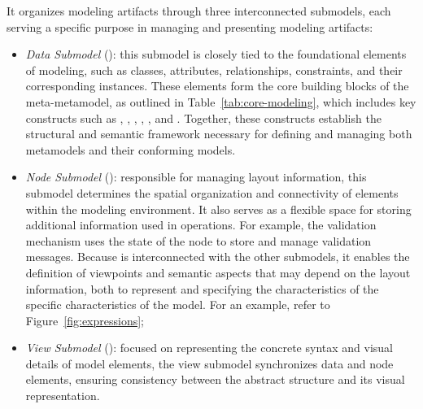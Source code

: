 %

It organizes modeling artifacts through three interconnected submodels, each serving a specific purpose in managing and presenting modeling artifacts: 
\begin{itemize}

    \item \textit{Data Submodel} (): this submodel is closely tied to the foundational elements of modeling, such as classes, attributes, relationships, constraints, and their corresponding instances. These elements form the core building blocks of the \jjodel{} meta-metamodel, as outlined in Table~\ref{tab:core-modeling}, which includes key constructs such as , , , , , and . Together, these constructs establish the structural and semantic framework necessary for defining and managing both metamodels and their conforming models.


    \item \textit{Node Submodel}  (): responsible for managing layout information, this submodel determines the spatial organization and connectivity of elements within the modeling environment. It also serves as a flexible space for storing additional information used in operations. For example, the validation mechanism uses the state of the node to store and manage validation messages. Because  is interconnected with the other submodels, it enables the definition of viewpoints and semantic aspects that may depend on the layout information, both to represent and specifying the characteristics of the specific characteristics of the model. For an example, refer to Figure~\ref{fig:expressions};
    
    \item \textit{View Submodel}  (): focused on representing the concrete syntax and visual details of model elements, the view submodel synchronizes data and node elements, ensuring consistency between the abstract structure and its visual representation.
\end{itemize}
